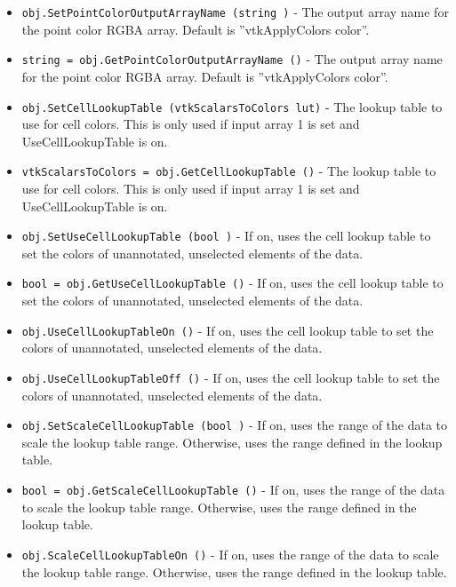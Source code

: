 \begin{itemize}
\item  \verb|obj.SetPointColorOutputArrayName (string )| -  The output array name for the point color RGBA array.
 Default is ''vtkApplyColors color''.

\item  \verb|string = obj.GetPointColorOutputArrayName ()| -  The output array name for the point color RGBA array.
 Default is ''vtkApplyColors color''.

\item  \verb|obj.SetCellLookupTable (vtkScalarsToColors lut)| -  The lookup table to use for cell colors. This is only used if
 input array 1 is set and UseCellLookupTable is on.

\item  \verb|vtkScalarsToColors = obj.GetCellLookupTable ()| -  The lookup table to use for cell colors. This is only used if
 input array 1 is set and UseCellLookupTable is on.

\item  \verb|obj.SetUseCellLookupTable (bool )| -  If on, uses the cell lookup table to set the colors of unannotated,
 unselected elements of the data.

\item  \verb|bool = obj.GetUseCellLookupTable ()| -  If on, uses the cell lookup table to set the colors of unannotated,
 unselected elements of the data.

\item  \verb|obj.UseCellLookupTableOn ()| -  If on, uses the cell lookup table to set the colors of unannotated,
 unselected elements of the data.

\item  \verb|obj.UseCellLookupTableOff ()| -  If on, uses the cell lookup table to set the colors of unannotated,
 unselected elements of the data.

\item  \verb|obj.SetScaleCellLookupTable (bool )| -  If on, uses the range of the data to scale the lookup table range.
 Otherwise, uses the range defined in the lookup table.

\item  \verb|bool = obj.GetScaleCellLookupTable ()| -  If on, uses the range of the data to scale the lookup table range.
 Otherwise, uses the range defined in the lookup table.

\item  \verb|obj.ScaleCellLookupTableOn ()| -  If on, uses the range of the data to scale the lookup table range.
 Otherwise, uses the range defined in the lookup table.


\end{itemize}
